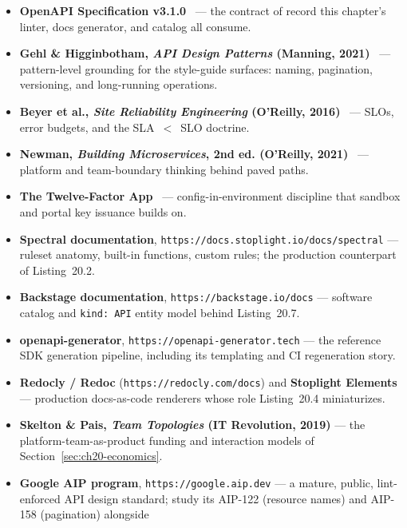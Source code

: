 \begin{itemize}
  \item \textbf{OpenAPI Specification v3.1.0}~\cite{openapi31} --- the
        contract of record this chapter's linter, docs generator, and
        catalog all consume.
  \item \textbf{Gehl \& Higginbotham, \emph{API Design Patterns}
        (Manning, 2021)}~\cite{gehl2021apidesign} --- pattern-level
        grounding for the style-guide surfaces: naming, pagination,
        versioning, and long-running operations.
  \item \textbf{Beyer et al., \emph{Site Reliability Engineering}
        (O'Reilly, 2016)}~\cite{beyer2016sre} --- SLOs, error budgets,
        and the SLA~$<$~SLO doctrine.
  \item \textbf{Newman, \emph{Building Microservices}, 2nd ed.
        (O'Reilly, 2021)}~\cite{newman2021microservices} --- platform and
        team-boundary thinking behind paved paths.
  \item \textbf{The Twelve-Factor App}~\cite{twelvefactor} ---
        config-in-environment discipline that sandbox and portal key
        issuance builds on.
  \item \textbf{Spectral documentation},
        \texttt{https://docs.stoplight.io/docs/spectral} --- ruleset
        anatomy, built-in functions, custom rules; the production
        counterpart of Listing~20.2.
  \item \textbf{Backstage documentation},
        \texttt{https://backstage.io/docs} --- software catalog and
        \texttt{kind: API} entity model behind Listing~20.7.
  \item \textbf{openapi-generator},
        \texttt{https://openapi-generator.tech} --- the reference SDK
        generation pipeline, including its templating and CI regeneration
        story.
  \item \textbf{Redocly / Redoc} (\texttt{https://redocly.com/docs}) and
        \textbf{Stoplight Elements} --- production docs-as-code renderers
        whose role Listing~20.4 miniaturizes.
  \item \textbf{Skelton \& Pais, \emph{Team Topologies} (IT Revolution,
        2019)} --- the platform-team-as-product funding and interaction
        models of Section~\ref{sec:ch20-economics}.
  \item \textbf{Google AIP program}, \texttt{https://google.aip.dev} ---
        a mature, public, lint-enforced API design standard; study its
        AIP-122 (resource names) and AIP-158 (pagination) alongside

\end{itemize}
